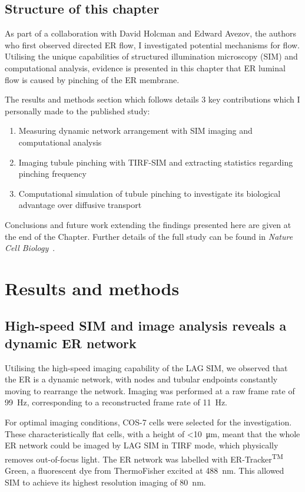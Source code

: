 \subsection{Structure of this chapter}
As part of a collaboration with David Holcman and Edward Avezov, the authors who first observed directed ER flow, I investigated potential mechanisms for flow. 
Utilising the unique capabilities of structured illumination microscopy (SIM) and computational analysis, evidence is presented in this chapter that ER luminal flow is caused by pinching of the ER membrane.

The results and methods section which follows details 3 key contributions which I personally made to the published study:
\begin{enumerate}
	\item Measuring dynamic network arrangement with SIM imaging and computational analysis
	\item Imaging tubule pinching with TIRF-SIM and extracting statistics regarding pinching frequency
	\item Computational simulation of tubule pinching to investigate its biological advantage over diffusive transport
\end{enumerate}

Conclusions and future work extending the findings presented here are given at the end of the Chapter. 
Further details of the full study can be found in \textit{Nature Cell Biology}~\cite{holcman2018single}. 

\section{Results and methods} \label{sec:ERresults}
\subsection{High-speed SIM and image analysis reveals a dynamic ER network} \label{sec:ERnetwork}
Utilising the high-speed imaging capability of the LAG SIM, we  observed that the ER is a dynamic network, with nodes and tubular endpoints constantly moving to rearrange the network. 
Imaging was performed at a raw frame rate of \SI{99}{\hertz}, corresponding to a reconstructed frame rate of \SI{11}{\hertz}. 

For optimal imaging conditions, COS-7 cells were selected for the investigation. 
These characteristically flat cells, with a height of <\SI{10}{\micro\meter}, 
meant that the whole ER network could be imaged by LAG SIM in TIRF mode, which physically removes out-of-focus light. 
The ER network was labelled with ER-Tracker\textsuperscript{TM} Green, a fluorescent dye from ThermoFisher excited at \SI{488}{\nano\meter}. 
This allowed SIM to achieve its highest resolution imaging of \SI{80}{\nano\meter}. 

